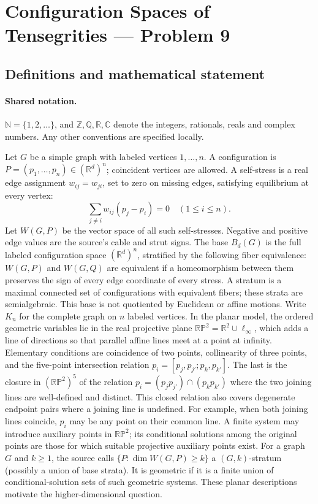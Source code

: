 \documentclass[11pt]{article}
\begin{document}
\section{Configuration Spaces of Tensegrities — Problem 9}\label{statement}

\subsection{Definitions and mathematical statement}

\paragraph{Shared notation.}$\mathbb N=\{1,2,\ldots\}$, and $\mathbb Z,\mathbb Q,\mathbb R,\mathbb C$ denote the integers, rationals, reals and complex numbers. Any other conventions are specified locally.


Let $G$ be a simple graph with labeled vertices $1,\ldots,n$. A configuration is $P=(p_1,\ldots,p_n)\in(\mathbb R^d)^n$; coincident vertices are allowed. A self-stress is a real edge assignment $w_{ij}=w_{ji}$, set to zero on missing edges, satisfying equilibrium at every vertex:
\[\sum_{j\ne i}w_{ij}(p_j-p_i)=0\quad(1\leq i\leq n).\]
Let $W(G,P)$ be the vector space of all such self-stresses. Negative and positive edge values are the source’s cable and strut signs. The base $B_d(G)$ is the full labeled configuration space $(\mathbb R^d)^n$, stratified by the following fiber equivalence: $W(G,P)$ and $W(G,Q)$ are equivalent if a homeomorphism between them preserves the sign of every edge coordinate of every stress. A stratum is a maximal connected set of configurations with equivalent fibers; these strata are semialgebraic. This base is not quotiented by Euclidean or affine motions. Write $K_n$ for the complete graph on $n$ labeled vertices. In the planar model, the ordered geometric variables lie in the real projective plane $\mathbb{RP}^2=\mathbb R^2\cup\ell_\infty$, which adds a line of directions so that parallel affine lines meet at a point at infinity. Elementary conditions are coincidence of two points, collinearity of three points, and the five-point intersection relation $p_i=[p_j,p_{j\prime};p_k,p_{k\prime}]$. The last is the closure in $(\mathbb{RP}^2)^5$ of the relation $p_i=(p_jp_{j\prime})\cap(p_kp_{k\prime})$ where the two joining lines are well-defined and distinct. This closed relation also covers degenerate endpoint pairs where a joining line is undefined. For example, when both joining lines coincide, $p_i$ may be any point on their common line. A finite system may introduce auxiliary points in $\mathbb{RP}^2$; its conditional solutions among the original points are those for which suitable projective auxiliary points exist. For a graph $G$ and $k\geq1$, the source calls $\{P:\dim W(G,P)\geq k\}$ a $(G,k)$-stratum (possibly a union of base strata). It is geometric if it is a finite union of conditional-solution sets of such geometric systems. These planar descriptions motivate the higher-dimensional question.
\end{document}
